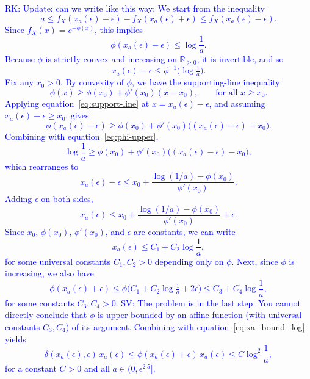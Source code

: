 \documentclass[10pt]{article} %
\def\eqref#1{equation~\ref{#1}}
\theoremstyle{plain}
\theoremstyle{definition}
\theoremstyle{remark}
\newcommand{\rkcomment}[1]{\textcolor{blue}{RK: #1}}
\begin{document}
\rkcomment{Update:  can we write like this way: 
We start from the inequality
\[
a  \leq  f_X(x_a(\epsilon)-\epsilon) - f_X(x_a(\epsilon)+\epsilon)  \leq  f_X(x_a(\epsilon)-\epsilon).
\]
Since $f_X(x) = e^{-\phi(x)}$, this implies
\begin{equation}\label{eq:phi-upper}
\phi(x_a(\epsilon)-\epsilon)  \leq  \log\frac{1}{a}.
\end{equation}
Because $\phi$ is strictly convex and increasing on $\mathbb{R}_{\ge 0}$, it is invertible, and so
\[
x_a(\epsilon)-\epsilon  \leq  \phi^{-1} \Big(\log\tfrac{1}{a}\Big).
\]
Fix any  $x_0>0$. By convexity of $\phi$, we have the supporting-line inequality
\begin{equation}\label{eq:support-line}
\phi(x)  \geq \phi(x_0) + \phi'(x_0)(x-x_0), \qquad \text{for all } x \ge x_0.
\end{equation}
Applying \eqref{eq:support-line} at $x=x_a(\epsilon)-\epsilon$, and assuming $x_a(\epsilon)-\epsilon \ge x_0$, gives
\[
\phi(x_a(\epsilon)-\epsilon)  \geq \phi(x_0)+\phi'(x_0)\big((x_a(\epsilon)-\epsilon)-x_0\big).
\]
Combining with \eqref{eq:phi-upper},
\[
\log\frac{1}{a}  \geq \phi(x_0)+\phi'(x_0)\big((x_a(\epsilon)-\epsilon)-x_0\big),
\]
which rearranges to
\[
x_a(\epsilon)-\epsilon  \leq  x_0 + \frac{\log(1/a)-\phi(x_0)}{\phi'(x_0)}.
\]
Adding $\epsilon$ on both sides,
\[
x_a(\epsilon)  \leq  x_0 + \frac{\log(1/a)-\phi(x_0)}{\phi'(x_0)} + \epsilon.
\]
Since $x_0$, $\phi(x_0)$, $\phi'(x_0)$, and $\epsilon$ are constants, we can write
\begin{equation}\label{eq:xa_bound_log}
x_a(\epsilon)  \leq  C_1 + C_2 \log\frac{1}{a},
\end{equation}
for some universal constants $C_1,C_2>0$ depending only on $\phi$.
Next, since $\phi$ is increasing, we also have
\[
\phi(x_a(\epsilon)+\epsilon)  \leq  \phi \Big(C_1 + C_2 \log\tfrac{1}{a} + 2\epsilon\Big)
 \leq  C_3 + C_4 \log\frac{1}{a},
\]
for some constants $C_3,C_4>0$. 
SV: The problem is in the last step. You cannot directly conclude that  $\phi$ is upper bounded by an affine function (with universal constants $C_3,C_4$) of its argument.
Combining with \eqref{eq:xa_bound_log} yields
\[
\delta(x_a(\epsilon),\epsilon)\,x_a(\epsilon) 
 \leq  \phi(x_a(\epsilon)+\epsilon)\,x_a(\epsilon) 
 \leq  C \log^2\frac{1}{a},
\]
for a constant $C>0$ and all $a \in (0,\epsilon^{2.5}]$.
}
\fi
\end{document}
